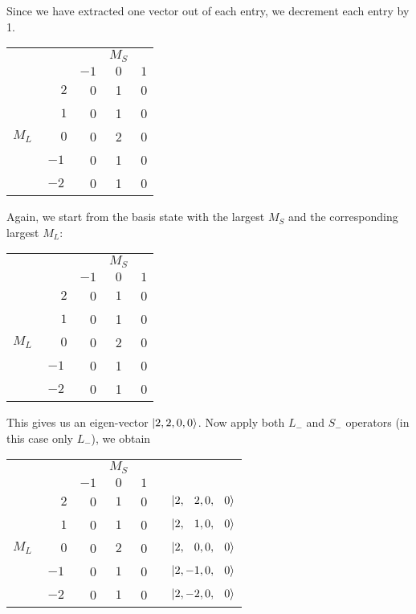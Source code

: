 Since we have extracted one vector out of each entry, we decrement each entry by 1.
\begin{center}
\begin{tabular}{c c|r c c}
      &  &  & $M_S$ & \\
      &  & $-1$ & $0$ & $1$ \\ \hline
      & $\phantom{-}2$ & 0 & 1 & 0 \\
      & $\phantom{-}1$ & 0 & 1 & 0 \\
$M_L$ & $\phantom{-}0$ & 0 & 2 & 0 \\
      & $-1$ & 0 & 1 & 0 \\
      & $-2$ & 0 & 1 & 0 \\
\end{tabular}
\end{center}

Again, we start from the basis state with the largest $M_S$ and the corresponding
largest $M_L$:
\begin{center}
\begin{tabular}{c c|r c c}
      &  &  & $M_S$ & \\
      &  & $-1$ & $0$ & $1$ \\ \hline
      & $\phantom{-}2$ & 0 & $\boxed{1}$ & 0 \\
      & $\phantom{-}1$ & 0 & 1 & 0 \\
$M_L$ & $\phantom{-}0$ & 0 & 2 & 0 \\
      & $-1$ & 0 & 1 & 0 \\
      & $-2$ & 0 & 1 & 0 \\
\end{tabular}
\end{center}

This gives us an eigen-vector $\Ket{2,2,0,0}$. Now apply both $L_-$ and $S_-$
operators (in this case only $L_-$), we obtain
\begin{center}
\begin{tabular}{c c|r c c r}
      &  &  & $M_S$ &  & \\
      &  & $-1$ & $0$ & $1$ & \\ \cline{1-5}
      & $\phantom{-}2$ & 0 & $\boxed{1}$ & 0 & $\quad\Ket{2,\phantom{-}2,0,\phantom{-}0}$ \\
      & $\phantom{-}1$ & 0 & $\boxed{1}$ & 0 & $\quad\Ket{2,\phantom{-}1,0,\phantom{-}0}$ \\
$M_L$ & $\phantom{-}0$ & 0 & $\boxed{2}$ & 0 & $\quad\Ket{2,\phantom{-}0,0,\phantom{-}0}$ \\
      & $-1$ & 0 & $\boxed{1}$ & 0 & $\quad\Ket{2,-1,0,\phantom{-}0}$ \\
      & $-2$ & 0 & $\boxed{1}$ & 0 & $\quad\Ket{2,-2,0,\phantom{-}0}$ \\
\end{tabular}
\end{center}

